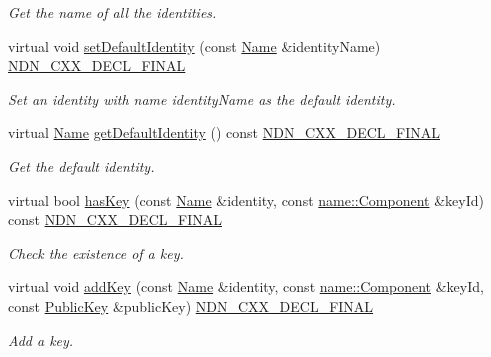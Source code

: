 \begin{DoxyCompactItemize}
\begin{DoxyCompactList}\small\item\em Get the name of all the identities. \end{DoxyCompactList}\item 
virtual void \hyperlink{classndn_1_1security_1_1PibSqlite3_acb133f56e0789677c061cc6967345cee}{set\+Default\+Identity} (const \hyperlink{classndn_1_1Name}{Name} \&identity\+Name) \hyperlink{ndn-cxx_2src_2common_8hpp_ab53a383abb72682805543301b5f2c244}{N\+D\+N\+\_\+\+C\+X\+X\+\_\+\+D\+E\+C\+L\+\_\+\+F\+I\+N\+AL}
\begin{DoxyCompactList}\small\item\em Set an identity with name {\ttfamily identity\+Name} as the default identity. \end{DoxyCompactList}\item 
virtual \hyperlink{classndn_1_1Name}{Name} \hyperlink{classndn_1_1security_1_1PibSqlite3_a6e76ec882a8c7fa600706266718b8043}{get\+Default\+Identity} () const \hyperlink{ndn-cxx_2src_2common_8hpp_ab53a383abb72682805543301b5f2c244}{N\+D\+N\+\_\+\+C\+X\+X\+\_\+\+D\+E\+C\+L\+\_\+\+F\+I\+N\+AL}
\begin{DoxyCompactList}\small\item\em Get the default identity. \end{DoxyCompactList}\item 
virtual bool \hyperlink{classndn_1_1security_1_1PibSqlite3_a798161982d8fafdcb3f5372b22cc1f48}{has\+Key} (const \hyperlink{classndn_1_1Name}{Name} \&identity, const \hyperlink{classndn_1_1name_1_1Component}{name\+::\+Component} \&key\+Id) const \hyperlink{ndn-cxx_2src_2common_8hpp_ab53a383abb72682805543301b5f2c244}{N\+D\+N\+\_\+\+C\+X\+X\+\_\+\+D\+E\+C\+L\+\_\+\+F\+I\+N\+AL}
\begin{DoxyCompactList}\small\item\em Check the existence of a key. \end{DoxyCompactList}\item 
virtual void \hyperlink{classndn_1_1security_1_1PibSqlite3_a035e33a50cf5640f13a1081c91475903}{add\+Key} (const \hyperlink{classndn_1_1Name}{Name} \&identity, const \hyperlink{classndn_1_1name_1_1Component}{name\+::\+Component} \&key\+Id, const \hyperlink{classndn_1_1PublicKey}{Public\+Key} \&public\+Key) \hyperlink{ndn-cxx_2src_2common_8hpp_ab53a383abb72682805543301b5f2c244}{N\+D\+N\+\_\+\+C\+X\+X\+\_\+\+D\+E\+C\+L\+\_\+\+F\+I\+N\+AL}
\begin{DoxyCompactList}\small\item\em Add a key. \end{DoxyCompactList}\item 

\end{DoxyCompactItemize}
